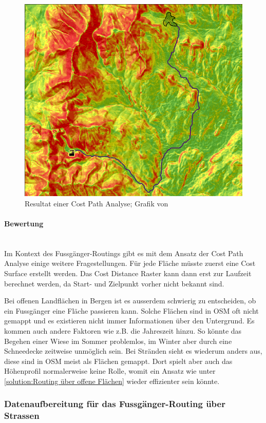 \begin{figure}[ht]
    \centering
    \includegraphics[width=0.6\linewidth]{technicalreport/img/cost_path_analysis}
    \caption[Cost Path Analyse]{Resultat einer Cost Path Analyse; Grafik von \cite{geospatial_analysis}}
    \label{fig:cost_path_analysis}
\end{figure}

\paragraph{Bewertung}~\\
Im Kontext des Fussgänger-Routings gibt es mit dem Ansatz der Cost Path Analyse einige weitere Fragestellungen. Für jede Fläche müsste zuerst eine Cost Surface erstellt werden. Das Cost Distance Raster kann dann erst zur Laufzeit berechnet werden, da Start- und Zielpunkt vorher nicht bekannt sind.

Bei offenen Landflächen in Bergen ist es ausserdem schwierig zu entscheiden, ob ein Fussgänger eine Fläche passieren kann. Solche Flächen sind in \ac{OSM} oft nicht gemappt und es existieren nicht immer Informationen über den Untergrund. Es kommen auch andere Faktoren wie z.B. die Jahreszeit hinzu. So könnte das Begehen einer Wiese im Sommer problemlos, im Winter aber durch eine Schneedecke zeitweise unmöglich sein. Bei Stränden sieht es wiederum anders aus, diese sind in \ac{OSM} meist als Flächen gemappt. Dort spielt aber auch das Höhenprofil normalerweise keine Rolle, womit ein Ansatz wie unter \ref{solution:Routing über offene Flächen} wieder effizienter sein könnte.


\subsubsection{Datenaufbereitung für das Fussgänger-Routing über Strassen}
\label{subsub:Datenaufbereitung für das Fussgänger-Routing über Strassen}

